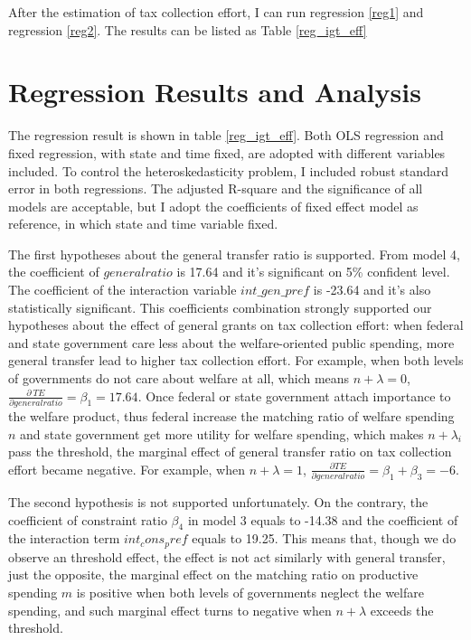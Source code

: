 After the estimation of tax collection effort, I can run regression \ref{reg1} and regression \ref{reg2}. The results can be listed as Table \ref{reg_igt_eff}

\section{Regression Results and Analysis}

The regression result is shown in table \ref{reg_igt_eff}. Both OLS regression and fixed regression, with state and time fixed, are adopted with different variables included. To control the heteroskedasticity problem, I included robust standard error in both regressions. The adjusted R-square and the significance of all models are acceptable, but I adopt the coefficients of fixed effect model as reference, in which state and time variable fixed.

The first hypotheses about the general transfer ratio is supported. From model 4, the coefficient of $generalratio$ is 17.64 and it's significant on 5\% confident level. The coefficient of the interaction variable $int\_gen\_pref$ is -23.64 and it's also statistically significant. This coefficients combination strongly supported our hypotheses about the effect of general grants on tax collection effort: when federal and state government care less about the welfare-oriented public spending, more general transfer lead to higher tax collection effort. For example, when both levels of governments do not care about welfare at all, which means $n+\lambda=0$, $\frac{\partial\ TE}{\partial generalratio}=\beta_1=17.64$. Once federal or state government attach importance to the welfare product, thus federal increase the matching ratio of welfare spending $n$ and state government get more utility for welfare spending, which makes $n+\lambda_i$ pass the threshold, the marginal effect of general transfer ratio on tax collection effort became negative. For example, when $n+\lambda=1$, $\frac{\partial TE}{\partial generalratio}=\beta_1+\beta_3=-6$.

The second hypothesis is not supported unfortunately. On the contrary, the coefficient of constraint ratio $\beta_4$ in model 3 equals to -14.38 and the coefficient of the interaction term $int_cons_pref$ equals to 19.25. This means that, though we do observe an threshold effect, the effect is not act similarly with general transfer, just the opposite, the marginal effect on the matching ratio on productive spending $m$ is positive when both levels of governments neglect the welfare spending, and such marginal effect turns to negative when $n+\lambda$ exceeds the threshold.

